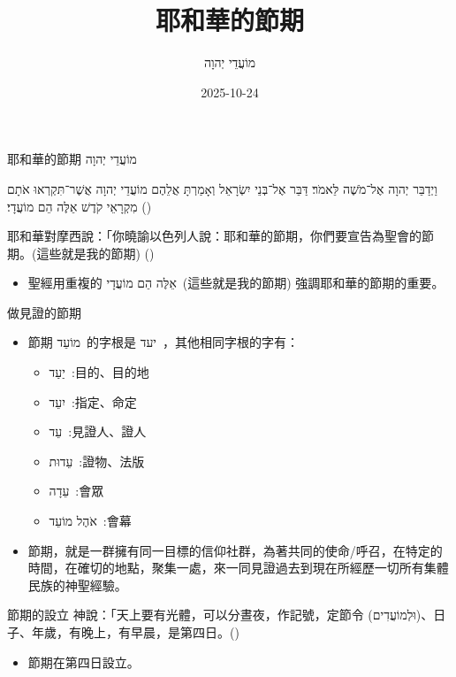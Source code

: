 \documentclass{beamer}
\title{耶和華的節期}
\subtitle{\texthebrew{מוֹעֲדֵי יְהוָה}}
\date{2025-10-24}
\makeatletter
\newcommand{\biblerefhebrew}[1]{\brm@bibleref{hebrew}{#1}}
\newcommand{\parvspace}{\par\vspace{0.5em}}
\makeatother
\begin{document}
\begin{frame}
  \titlepage
\end{frame}

\begin{frame}{耶和華的節期 \texthebrew{מוֹעֲדֵי יְהוָה}}
  \begin{hebrew}
    וַיְדַבֵּר יְהוָה אֶל־מֹשֶׁה לֵּאמֹר׃ דַּבֵּר אֶל־בְּנֵי יִשְׂרָאֵל וְאָמַרְתָּ אֲלֵהֶם \alert{מוֹעֲדֵי יְהוָה} אֲשֶׁר־תִּקְרְאוּ אֹתָם מִקְרָאֵי קֹדֶשׁ \alert{אֵלֶּה הֵם מוֹעֲדָי׃} (\biblerefhebrew{Lv 23:1-2})
  \end{hebrew}\parvspace
  耶和華對摩西說：「你曉諭以色列人說：\alert{耶和華的節期}，你們要宣告為聖會的節期。\alert{(這些就是我的節期)} ()\parvspace
  \begin{itemize}
    \item 聖經用重複的 \alert{\texthebrew{אֵלֶּה הֵם מוֹעֲדָי}\ (這些就是我的節期)} 強調耶和華的節期的重要\parencite{作見證的節期}。
  \end{itemize}
\end{frame}

\begin{frame}{做見證的節期}
  \begin{itemize}
    \item 節期 \texthebrew{מוֹעֵד}\ 的字根是 \texthebrew{יעד}\ ，其他相同字根的字有\parencite{節期的功能}：
      \begin{itemize}
        \item \texthebrew{יַעַד}\ :目的、目的地
        \item \texthebrew{יִעֵד}\ :指定、命定
        \item \texthebrew{עֵד}\ :見證人、證人
        \item \texthebrew{עֵדוּת}\ :證物、法版
        \item \texthebrew{עֵדָה}\ :會眾
        \item \texthebrew{אֹהֶל מוֹעֵד}\ :會幕
      \end{itemize}
    \item \alert{節期}，就是一群擁有\alert{同一目標}的信仰社群，為著\alert{共同的使命/呼召}，在\alert{特定的時間}，在確切的地點，聚集一處，來\alert{一同見證}過去到現在所經歷一切所有\alert{集體民族}的神聖經驗\parencite{節期的功能}。
  \end{itemize}
\end{frame}

\begin{frame}{節期的設立}
  神說：「天上要有光體，可以分晝夜，作記號，\alert{定節令 (\texthebrew{וּלְמוֹעֲדִים})}、日子、年歲，\textellipsis{}有晚上，有早晨，是\alert{第四日}。()
  \begin{itemize}
    \item 節期在\alert{第四日}設立。
  \end{itemize}
\end{frame}
\end{document}
